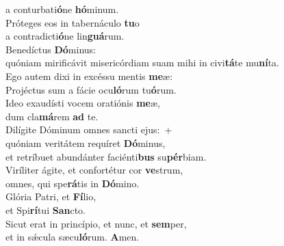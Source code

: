 \oddverse a conturbati\textbf{ó}ne \textbf{hó}minum.\\
\evenverse Próteges eos in tabernáculo \textbf{tu}o~\*\\
\evenverse a contradicti\textbf{ó}ne lin\textbf{guá}rum.\\
\oddverse Benedíctus \textbf{Dó}minus:~\*\\
\oddverse quóniam mirificávit misericórdiam suam mihi in civi\textbf{tá}te mu\textbf{ní}ta.\\
\evenverse Ego autem dixi in excéssu mentis \textbf{me}æ:~\*\\
\evenverse Projéctus sum a fácie ocu\textbf{ló}rum tu\textbf{ó}rum.\\
\oddverse Ideo exaudísti vocem oratiónis \textbf{me}æ,~\*\\
\oddverse dum cla\textbf{má}rem \textbf{ad} te.\\
\evenverse Dilígite Dóminum omnes sancti ejus:~+\\
\evenverse  quóniam veritátem requíret \textbf{Dó}minus,~\*\\
\evenverse et retríbuet abundánter faciénti\textbf{bus} su\textbf{pér}biam.\\
\oddverse Viríliter ágite, et confortétur cor \textbf{ve}strum,~\*\\
\oddverse omnes, qui spe\textbf{rá}tis in \textbf{Dó}mino.\\
\evenverse Glória Patri, et \textbf{Fí}lio,~\*\\
\evenverse et Spi\textbf{rí}tui \textbf{San}cto.\\
\oddverse Sicut erat in princípio, et nunc, et \textbf{sem}per,~\*\\
\oddverse et in sǽcula sæcu\textbf{ló}rum. \textbf{A}men.\\
